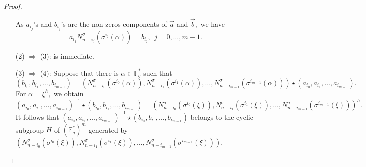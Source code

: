\documentclass[10pt,a4paper]{amsart}
\newcommand{\Fq}{\mathbb{F}_{q}}
\begin{document}
\begin{proof}
\begin{itemize}
As  $ a_{i_j}$'s and $  b_{i_j}$'s are the non-zeros components of $\vec{a}$ and $\vec{b},$  we have
$$ a_{i_j} N_{n-{i_j}}^{\sigma}(\sigma^{i_j}(\alpha)) = b_{i_j},\  \ j=0,\ldots,m-1.$$

 \item[(2) $\Rightarrow$ (3):]  is immediate. 

 \item[(3) $\Rightarrow$ (4):]
Suppose that there is $\alpha\in \Fq^{*}$ such that 
$$  (b_{i_0}, b_{i_1},\ldots, b_{i_{m-1}} )=  \left( N_{n-i_0}^{\sigma}(\sigma^{i_0}(\alpha)), 
N^{\sigma}_{n-i_1}(\sigma^{i_1}(\alpha)), \ldots, N^{\sigma}_{n-i_{m-1}}(\sigma^{i_{m-1}}(\alpha))\right)\star ( a_{i_0},  a_{i_1}, \ldots, a_{i_{m-1}}).$$ 
For $\alpha= \xi^h,$ we obtain 
$$  ( a_{i_0}, a_{i_1},\ldots, a_{i_{m-1}})^{-1}\star (b_{i_0}, b_{i_1},\ldots, b_{i_{m-1}} ) =   \left( N_{n-i_0}^{\sigma}(\sigma^{i_0}(\xi)), 
N^{\sigma}_{n-i_1}(\sigma^{i_1}(\xi)), \ldots, N^{\sigma}_{n-i_{m-1}}(\sigma^{i_{m-1}}(\xi))\right)^h .$$
It follows that $  ( a_{i_0},  a_{i_1}, \ldots, a_{i_{m-1}})^{-1}\star ( b_{i_0},  b_{i_1}, \ldots, b_{i_{m-1}}) $ belongs to the cyclic subgroup  $H$ of $ (\Fq^{*})^m$ generated by $ \left( N_{n-i_0}^{\sigma}(\sigma^{i_0}(\xi)), 
N^{\sigma}_{n-i_1}(\sigma^{i_1}(\xi)), \ldots, N^{\sigma}_{n-i_{m-1}}(\sigma^{i_{m-1}}(\xi))\right).$
   

\end{itemize}
\end{proof}
\end{document}
